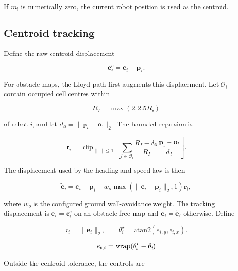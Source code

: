 \documentclass[11pt]{article}
\begin{document}
If $m_i$ is numerically zero, the current robot position is used as the centroid.


\subsection{Centroid tracking}


Define the raw centroid displacement


\begin{equation}
\mathbf e_i^c=\mathbf c_i-\mathbf p_i.
\end{equation}


For obstacle maps, the Lloyd path first augments this displacement. Let $\mathcal O_i$ contain occupied cell centres within


\begin{equation}
R_I=\max(2,2.5R_o)
\end{equation}


of robot $i$, and let $d_{il}=\lVert\mathbf p_i-\mathbf o_l\rVert_2$. The bounded repulsion is


\begin{equation}
\mathbf r_i
=
\operatorname{clip}_{\lVert\cdot\rVert\le1}
\left[
\sum_{l\in\mathcal O_i}
\frac{R_I-d_{il}}{R_I}
\frac{\mathbf p_i-\mathbf o_l}{d_{il}}
\right].
\end{equation}


The displacement used by the heading and speed law is then


\begin{equation}
\widetilde{\mathbf e}_i
=
\mathbf c_i-\mathbf p_i
+w_o\max(\lVert\mathbf c_i-\mathbf p_i\rVert_2,1)\mathbf r_i,
\end{equation}


where $w_o$ is the configured ground wall-avoidance weight. The tracking displacement is $\mathbf e_i=\mathbf e_i^c$ on an obstacle-free map and $\mathbf e_i=\widetilde{\mathbf e}_i$ otherwise. Define


\begin{equation}
r_i=\lVert\mathbf e_i\rVert_2,
\qquad
\theta_i^\star=\mathrm{atan2}(e_{i,y},e_{i,x}).
\end{equation}


\begin{equation}
e_{\theta,i} \\
= \\
\mathrm{wrap}(\theta_i^\star-\theta_i)
\end{equation}


Outside the centroid tolerance, the controls are
\end{document}
